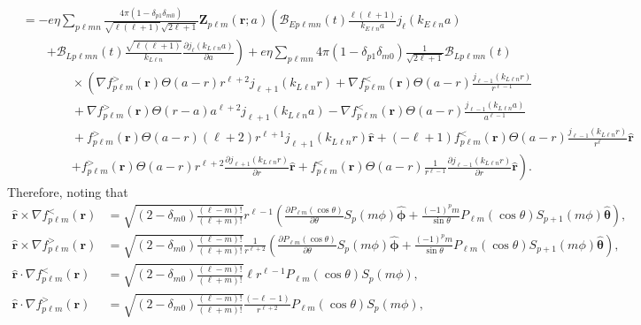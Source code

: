 \documentclass{article}
\begin{document}
\begin{equation}
\begin{split}
&= -e\eta\sum_{p\ell mn}\frac{4\pi(1 - \delta_{p1}\delta_{m0})}{\sqrt{\ell(\ell + 1)}\sqrt{2\ell + 1}}\mathbf{Z}_{p\ell m}(\mathbf{r};a)\left(\mathcal{B}_{Ep\ell mn}(t)\frac{\ell(\ell + 1)}{k_{E\ell n}a}j_\ell(k_{E\ell n}a) \right.\\
&\qquad\left. + \mathcal{B}_{Lp\ell mn}(t)\frac{\sqrt{\ell(\ell + 1)}}{k_{L\ell n}}\frac{\partial j_{\ell}(k_{L\ell n}a)}{\partial a}\right)+ e\eta\sum_{p\ell mn}4\pi(1 - \delta_{p1}\delta_{m0})\frac{1}{\sqrt{2\ell + 1}}\mathcal{B}_{Lp\ell mn}(t)\\
&\qquad\qquad\times\left(\nabla f_{p\ell m}^>(\mathbf{r})\Theta(a - r)r^{\ell + 2}j_{\ell + 1}(k_{L\ell n}r) + \nabla f_{p\ell m}^<(\mathbf{r})\Theta(a - r)\frac{j_{\ell - 1}(k_{L\ell n}r)}{r^{\ell - 1}}\right.\\
&\qquad\qquad + \nabla f_{p\ell m}^>(\mathbf{r})\Theta(r - a)a^{\ell + 2}j_{\ell + 1}(k_{L\ell n}a) - \nabla f_{p\ell m}^<(\mathbf{r})\Theta(a - r)\frac{j_{\ell - 1}(k_{L\ell n}a)}{a^{\ell - 1}}\\
&\qquad\qquad + f_{p\ell m}^>(\mathbf{r})\Theta(a - r)(\ell + 2)r^{\ell + 1}j_{\ell + 1}(k_{L\ell n}r)\hat{\mathbf{r}} + (-\ell + 1)f_{p\ell m}^<(\mathbf{r})\Theta(a - r)\frac{j_{\ell - 1}(k_{L\ell n}r)}{r^\ell}\hat{\mathbf{r}}\\
&\qquad\qquad\left. + f_{p\ell m}^>(\mathbf{r})\Theta(a - r)r^{\ell + 2}\frac{\partial j_{\ell + 1}(k_{L\ell n}r)}{\partial r}\hat{\mathbf{r}} + f_{p\ell m}^<(\mathbf{r})\Theta(a - r)\frac{1}{r^{\ell - 1}}\frac{\partial j_{\ell - 1}(k_{L\ell n}r)}{\partial r}\hat{\mathbf{r}}\right).
\end{split}
\end{equation}
Therefore, noting that
\begin{equation}
\begin{split}
\hat{\mathbf{r}}\times\nabla f_{p\ell m}^<(\mathbf{r}) &= \sqrt{(2 - \delta_{m0})\frac{(\ell - m)!}{(\ell + m)!}}r^{\ell - 1}\left(\frac{\partial P_{\ell m}(\cos\theta)}{\partial \theta}S_p(m\phi)\hat{\bm{\phi}} + \frac{(-1)^pm}{\sin\theta}P_{\ell m}(\cos\theta)S_{p+1}(m\phi)\hat{\bm{\theta}}\right),\\
\hat{\mathbf{r}}\times\nabla f_{p\ell m}^>(\mathbf{r}) &= \sqrt{(2 - \delta_{m0})\frac{(\ell - m)!}{(\ell + m)!}}\frac{1}{r^{\ell + 2}}\left(\frac{\partial P_{\ell m}(\cos\theta)}{\partial \theta}S_p(m\phi)\hat{\bm{\phi}} + \frac{(-1)^pm}{\sin\theta}P_{\ell m}(\cos\theta)S_{p+1}(m\phi)\hat{\bm{\theta}}\right),\\
\hat{\mathbf{r}}\cdot\nabla f_{p\ell m}^<(\mathbf{r}) &= \sqrt{(2 - \delta_{m0})\frac{(\ell - m)!}{(\ell + m)!}}\ell r^{\ell - 1}P_{\ell m}(\cos\theta)S_p(m\phi),\\
\hat{\mathbf{r}}\cdot\nabla f_{p\ell m}^>(\mathbf{r}) &= \sqrt{(2 - \delta_{m0})\frac{(\ell - m)!}{(\ell + m)!}}\frac{(-\ell - 1)}{r^{\ell + 2}}P_{\ell m}(\cos\theta)S_p(m\phi),
\end{split}
\end{equation}
\end{document}
